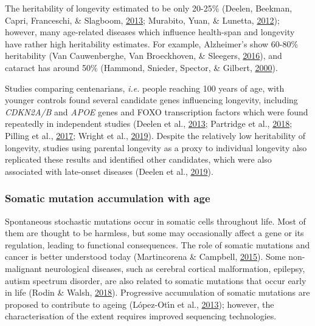 \documentclass[12pt,twoside]{unicam}
\begin{document}
The heritability of longevity estimated to be only 20-25\% (Deelen, Beekman, Capri, Franceschi, \& Slagboom, \protect\hyperlink{ref-Deelen2013}{2013}; Murabito, Yuan, \& Lunetta, \protect\hyperlink{ref-Murabito2012}{2012}); however, many age-related diseases which influence health-span and longevity have rather high heritability estimates. For example, Alzheimer's show 60-80\% heritability (Van Cauwenberghe, Van Broeckhoven, \& Sleegers, \protect\hyperlink{ref-VanCauwenberghe2016}{2016}), and cataract has around 50\% (Hammond, Snieder, Spector, \& Gilbert, \protect\hyperlink{ref-Hammond2000}{2000}).

Studies comparing centenarians, \emph{i.e.} people reaching 100 years of age, with younger controls found several candidate genes influencing longevity, including \emph{CDKN2A/B} and \emph{APOE} genes and FOXO transcription factors which were found repeatedly in independent studies (Deelen et al., \protect\hyperlink{ref-Deelen2013}{2013}; Partridge et al., \protect\hyperlink{ref-Partridge2018}{2018}; Pilling et al., \protect\hyperlink{ref-Pilling2017}{2017}; Wright et al., \protect\hyperlink{ref-Wright2019}{2019}). Despite the relatively low heritability of longevity, studies using parental longevity as a proxy to individual longevity also replicated these results and identified other candidates, which were also associated with late-onset diseases (Deelen et al., \protect\hyperlink{ref-Deelen2019}{2019}).

\hypertarget{somatic-mutation-accumulation-with-age}{%
\subsubsection{Somatic mutation accumulation with age}\label{somatic-mutation-accumulation-with-age}}

Spontaneous stochastic mutations occur in somatic cells throughout life. Most of them are thought to be harmless, but some may occasionally affect a gene or its regulation, leading to functional consequences. The role of somatic mutations and cancer is better understood today (Martincorena \& Campbell, \protect\hyperlink{ref-Martincorena2015}{2015}). Some non-malignant neurological diseases, such as cerebral cortical malformation, epilepsy, autism spectrum disorder, are also related to somatic mutations that occur early in life (Rodin \& Walsh, \protect\hyperlink{ref-Rodin2018}{2018}). Progressive accumulation of somatic mutations are proposed to contribute to ageing (López-Otı́n et al., \protect\hyperlink{ref-Lopez-Otin2013}{2013}); however, the characterisation of the extent requires improved sequencing technologies.
\end{document}
